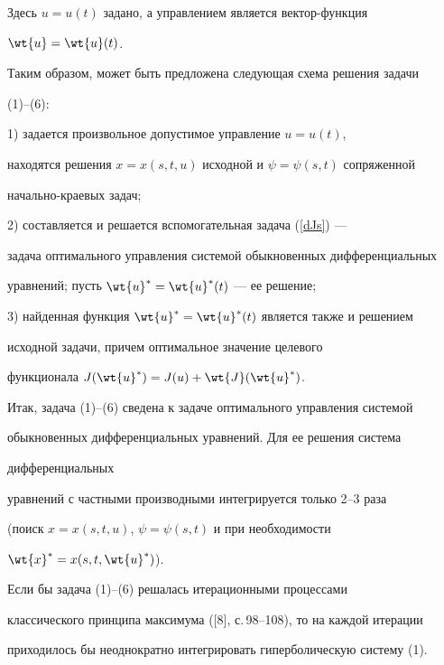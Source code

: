 Здесь $u=u(t)$ задано, а управлением является вектор-функция


$\wt{u}=\wt{u}(t)$.





Таким образом, может быть предложена следующая схема решения задачи


(1)--(6):





1) задается произвольное допустимое управление $u=u(t)$,


находятся решения $x = x(s,t,u)$ исходной и $\psi = \psi(s,t)$ сопряженной 


начально-краевых задач;





2) составляется и решается вспомогательная задача (\ref{dJs}) ---


задача оптимального управления системой обыкновенных дифференциальных


уравнений; пусть $\wt{u}^*=\wt{u}^*(t)$ --- ее решение;





3) найденная функция $\wt{u}^*=\wt{u}^*(t)$ является также и решением 


исходной задачи, причем оптимальное значение целевого


функционала $J(\wt{u}^*)=J(u)+\wt{J}(\wt{u}^*)$.





Итак, задача (1)--(6) сведена к задаче оптимального управления системой


обыкновенных дифференциальных уравнений. Для ее решения система 


дифференциальных


уравнений с частными производными интегрируется только 2--3 раза


(поиск $x=x(s,t,u)$, $\psi=\psi (s,t)$ и при необходимости 


$\wt{x}^*=x(s,t,\wt{u}^*)$).





Если бы задача (1)--(6) решалась итерационными процессами


классического принципа максимума ([8], с.\,98--108), то на каждой итерации


приходилось бы неоднократно интегрировать гиперболическую систему (1).





